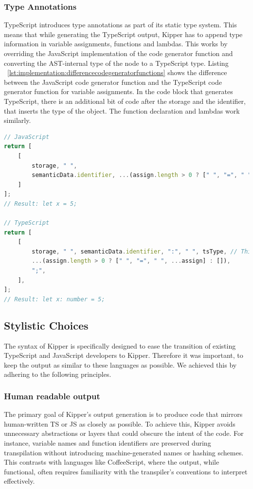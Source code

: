 \subsubsection{Type Annotations}

TypeScript introduces type annotations as part of its static type system. This means that while generating the TypeScript output, Kipper has to append type information in variable assignments, functions and lambdas. This works by overriding the JavaScript implementation of the code generator function and converting the AST-internal type of the node to a TypeScript type. Listing ~\ref{lst:implementation:differencecodegeneratorfunctions} shows the difference between the JavaScript code generator function and the TypeScript code generator function for variable assignments. In the code block that generates TypeScript, there is an additional bit of code after the storage and the identifier, that inserts the type of the object. The function declaration and lambdas work similarly.

\begin{lstlisting}[language=TypeScript,caption=Difference in code generator functions,label=lst:implementation:differencecodegeneratorfunctions]
// JavaScript
return [
	[
		storage, " ",
		semanticData.identifier, ...(assign.length > 0 ? [" ", "=", " ", ...assign] : []), ";"
	]
];
// Result: let x = 5;

// TypeScript
return [
	[
		storage, " ", semanticData.identifier, ":", " ", tsType, // This inserts the type
		...(assign.length > 0 ? [" ", "=", " ", ...assign] : []),
		";",
	],
];
// Result: let x: number = 5;
\end{lstlisting}

\subsection{Stylistic Choices}

The syntax of Kipper is specifically designed to ease the transition of existing TypeScript and JavaScript developers to Kipper. Therefore it was important, to keep the output as similar to these languages as possible. We achieved this by adhering to the following principles.

\subsubsection{Human readable output}

The primary goal of Kipper's output generation is to produce code that mirrors human-written TS or JS as closely as possible. To achieve this, Kipper avoids unnecessary abstractions or layers that could obscure the intent of the code. For instance, variable names and function identifiers are preserved during \gls{transpilation} without introducing machine-generated names or hashing schemes. This contrasts with languages like CoffeeScript, where the output, while functional, often requires familiarity with the transpiler's conventions to interpret effectively.


